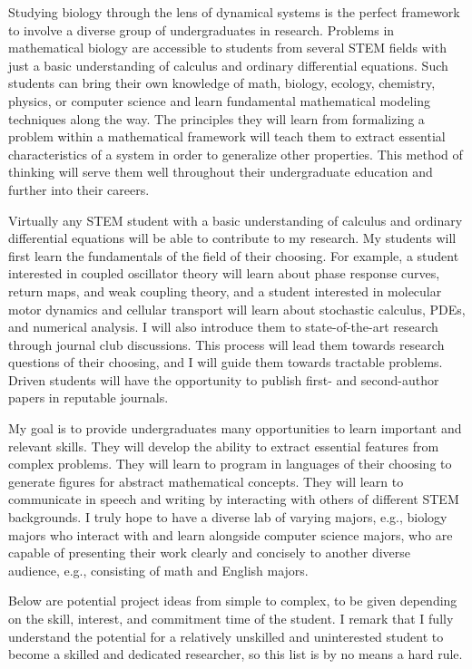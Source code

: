 \documentclass[a4paper,11pt]{article}
\begin{document}
	Studying biology through the lens of dynamical systems is the perfect framework to involve a diverse group of undergraduates in research. Problems in mathematical biology are accessible to students from several STEM fields with just a basic understanding of calculus and ordinary differential equations. Such students can bring their own knowledge of math, biology, ecology, chemistry, physics, or computer science and learn fundamental mathematical modeling techniques along the way. The principles they will learn from formalizing a problem within a mathematical framework will teach them to extract essential characteristics of a system in order to generalize other properties. This method of thinking will serve them well throughout their undergraduate education and further into their careers.
	
	Virtually any STEM student with a basic understanding of calculus and ordinary differential equations will be able to contribute to my research. My students will first learn the fundamentals of the field of their choosing. For example, a student interested in coupled oscillator theory will learn about phase response curves, return maps, and weak coupling theory, and a student interested in molecular motor dynamics and cellular transport will learn about stochastic calculus, PDEs, and numerical analysis. I will also introduce them to state-of-the-art research through journal club discussions. This process will lead them towards research questions of their choosing, and I will guide them towards tractable problems. Driven students will have the opportunity to publish first- and second-author papers in reputable journals.
	
	My goal is to provide undergraduates many opportunities to learn important and relevant skills. They will develop the ability to extract essential features from complex problems. They will learn to program in languages of their choosing to generate figures for abstract mathematical concepts. They will learn to communicate in speech and writing by interacting with others of different STEM backgrounds. I truly hope to have a diverse lab of varying majors, e.g., biology majors who interact with and learn alongside computer science majors, who are capable of presenting their work clearly and concisely to another diverse audience, e.g., consisting of math and English majors.
	
	Below are potential project ideas from simple to complex, to be given depending on the skill, interest, and commitment time of the student. I remark that I fully understand the potential for a relatively unskilled and uninterested student to become a skilled and dedicated researcher, so this list is by no means a hard rule.
	
\end{document}
